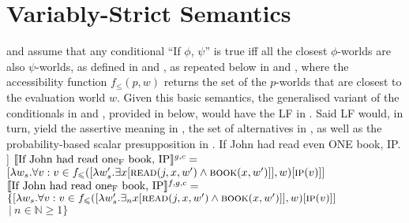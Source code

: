 \section{Variably-Strict Semantics}
\textcite{Stalnaker1968} and \textcite{Lewis1973} assume that any conditional \enquote{If $\phi$, $\psi$} is true iff all the closest $\phi$-worlds are also $\psi$-worlds, as defined in  and , as repeated below in  and , where the accessibility function $f_\leqslant(p,w)$ returns the set of the $p$-worlds that are closest to the evaluation world $w$.
\ex{}\xe
\ex{}\xe
Given this basic semantics, the generalised variant of the conditionals in  and , provided in  below, would have the LF in . Said LF would, in turn, yield the assertive meaning in , the set of alternatives in , as well as the probability-based scalar presupposition in .
\pex\label{ex:vs-neutral-conditional}
\a If John had read even \MakeUppercase{one} book, IP.
\a[] [even\textsubscript{C} [If John had read one\textsubscript{F} book IP]]
\a $\intension[g,c]{If John had read one\textsubscript{F} book, IP}=$\\$[\lambda w_s.\forall v:v\in f_\leqslant([\lambda w'_s.\exists{x}[\predicate{read}(j,x,w')\land\predicate{book}(x,w')]],w)[\predicate{ip}(v)]]$
\a $\intension[f,g,c]{If John had read one\textsubscript{F} book, IP}=$\\$\{[\lambda w_s.\forall v:v\in f_\leqslant([\lambda w'_s.\exists_n{x}[\predicate{read}(j,x,w')\land\predicate{book}(x,w')]],w)[\predicate{ip}(v)]]$\\\emptyfill$~|~n\in\mathbb{N}\geqslant1\}$
\xe

